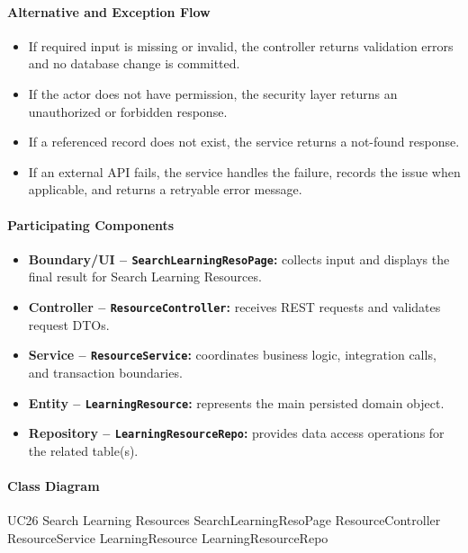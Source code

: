 \paragraph{Alternative and Exception Flow}

\begin{itemize}
    \item If required input is missing or invalid, the controller returns validation errors and no database change is committed.
    \item If the actor does not have permission, the security layer returns an unauthorized or forbidden response.
    \item If a referenced record does not exist, the service returns a not-found response.
    \item If an external API fails, the service handles the failure, records the issue when applicable, and returns a retryable error message.
\end{itemize}

\paragraph{Participating Components}

\begin{itemize}
    \item \textbf{Boundary/UI -- \texttt{SearchLearningResoPage}:} collects input and displays the final result for Search Learning Resources.
    \item \textbf{Controller -- \texttt{ResourceController}:} receives REST requests and validates request DTOs.
    \item \textbf{Service -- \texttt{ResourceService}:} coordinates business logic, integration calls, and transaction boundaries.
    \item \textbf{Entity -- \texttt{LearningResource}:} represents the main persisted domain object.
    \item \textbf{Repository -- \texttt{LearningResourceRepo}:} provides data access operations for the related table(s).
\end{itemize}

\paragraph{Class Diagram}

\ClassDiagram
{UC26 Search Learning Resources}
{SearchLearningResoPage}
{ResourceController}
{ResourceService}
{LearningResource}
{LearningResourceRepo}

